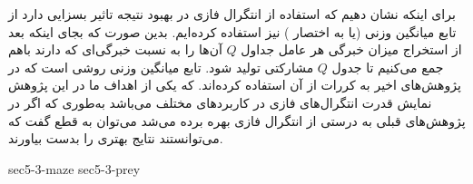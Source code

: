 برای اینکه نشان دهیم که استفاده از انتگرال فازی در بهبود نتیجه تاثیر بسزایی دارد از تابع میانگین وزنی (یا به اختصار ) نیز استفاده کرده‌ایم. بدین صورت که بجای اینکه بعد از استخراج میزان خبرگی هر عامل جداول $Q$ آن‌ها را به نسبت خبرگی‌ای که دارند باهم جمع می‌کنیم تا جدول $Q$ مشارکتی تولید شود. تابع میانگین وزنی روشی است که در پژوهش‌های اخیر به کررات از آن استفاده کرده‌اند. که یکی از اهداف ما در این پژوهش نمایش قدرت انتگرال‌های فازی در کاربرد‌های مختلف می‌باشد به‌طوری که اگر در پژوهش‌های قبلی به درستی از انتگرال فازی بهره برده می‌شد می‌توان به قطع گفت که می‌توانستند نتایج بهتری را بدست بیاورند.

{sec5-3-maze}
{sec5-3-prey}